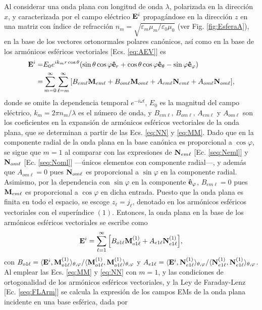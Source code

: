 Al considerar una onda plana con longitud de onda $\lambda$, polarizada en la dirección $x$, y caracterizada por el campo eléctrico $\vb{E}^i$ propagándose en la dirección $z$ en una matriz con índice de refracción $n_m = \sqrt{\varepsilon_m\mu_m / \varepsilon_0\mu_0}$ (ver Fig. \ref{fig:EsferaA}), en la base de los vectores ortonormales polares canónicos, así como en la base de los armónicos esféricos vectoriales [Ecs. \eqref{eq:AEV}] es
	\begin{align*}
\vb{E}^i = & E_0 e^{ik_mr\cos\theta} \qty(\sin\theta\cos\varphi \vu{e}_r + 
								\cos\theta\cos\varphi\vu{e}_\theta-\sin\varphi\vu{e}_\varphi)\notag\\
	 =& \sum_{m=0}^\infty\sum_{\ell=m}^\infty \qty[ B_{em\ell}\vb{M}_{em\ell} 
	 	+ B_{om\ell}\vb{M}_{om\ell} +A_{em\ell}\vb{N}_{em\ell} + A_{om\ell}\vb{N}_{om\ell}],
	\end{align*}
donde se omite la dependencia temporal $e^{-i\omega t}$, $E_0$ es la magnitud del campo eléctrico, $k_m=2\pi n_m/\lambda$ es el número de onda,  y  $B_{em\ell},\, B_{om\ell},\, A_{em\ell}$ y $ A_{om\ell}$ son los coeficientes en la expansión de armónicos esféricos vectoriales de la onda plana, que se determinan a partir de las Ecs. \eqref{eq:NN} y \eqref{eq:MM}. Dado que en la componente radial de la onda plana en la base canónica es proporcional a $\cos\varphi$, se sigue que $m=1$ al comparar con las expresiones de $\vb{N}_{em\ell}$ [Ec. \eqref{seq:Neml}] y $\vb{N}_{om\ell}$ [Ec. \eqref{seq:Noml}] ---únicos elementos con componente radial---, y además que $A_{om\ell}=0$ pues $\vb{N}_{om\ell}$ es proporcional a $\sin\varphi$ en la componente radial. Asimismo, por la dependencia con $\sin\varphi$ en la componente  $\vu{e}_\varphi$, $B_{em\ell}=0$ pues $\vb{M}_{em\ell}$ es proporcional a $\cos\varphi$ en dicha entrada. Puesto que la onda plana es finita en todo el espacio, se escoge $z_\ell = j_\ell$, denotado en los armónicos esféricos vectoriales con el superíndice $(1)$. Entonces, la onda plana en la base de los armónicos esféricos vectoriales se escribe como 
	\begin{align*}
	\vb{E}^i = \sum_{\ell=1}^\infty \qty[B_{o1\ell}\vb{M}_{o1\ell}^{(1)} + A_{e1\ell}\vb{N}_{e1\ell}^{(1)}],
	\end{align*}
con $B_{o1\ell} = \langle \vb{E}^i, \vb{M}_{o1\ell}^{(1)}  \rangle_{\theta,\varphi} / \langle \vb{M}_{o1\ell}^{(1)} ,\vb{M}_{o1\ell}^{(1)} \rangle_{\theta,\varphi}$ y $ A_{e1\ell} = \langle \vb{E}^i, \vb{N}_{e1\ell}^{(1)} \rangle_{\theta,\varphi} / \langle \vb{N}_{e1\ell}^{(1)},\vb{N}_{e1\ell}^{(1)} \rangle_{\theta,\varphi}$. Al emplear las Ecs. \eqref{eq:MM} y \eqref{eq:NN} con $m=1$, y las condiciones de ortogonalidad de los armónicos esféricos vectoriales, y la Ley de Faraday-Lenz [Ec. \eqref{seq:FLArm}] se calcula la expresión de los campos EMs de la onda plana incidente en una base esférica, dada por

